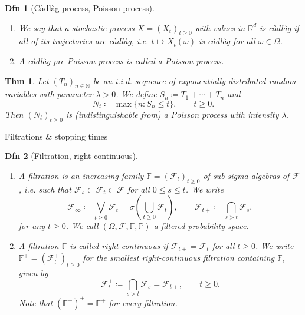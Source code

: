 \documentclass[a4paper]{article}
\theoremstyle{mytheoremstyle}
\newtheorem{definition}{Dfn}
\newtheorem{theorem}{Thm}
\newcommand{\1}{\mathds{1}}
\begin{document}
\begin{multicols*}{3}
\begin{unlabeledbox}
  \begin{definition}[C{\`a}dl{\`a}g process, Poisson process]
    \begin{enumerate}
      \item We say that a stochastic process $X = (X_t)_{t \geqslant 0}$ with values in
      $\mathbb{R}^d$ is {\emph{c{\`a}dl{\`a}g}} if all of its trajectories are
      {\emph{c{\`a}dl{\`a}g}}, i.e. $t \mapsto X_t (\omega)$ is {\emph{c{\`a}dl{\`a}g}}
      for all $\omega \in \Omega$.

      \item A c{\`a}dl{\`a}g pre-Poisson process is called a {\emph{Poisson
        process}}.
    \end{enumerate}
  \end{definition}

  \begin{theorem}
    \label{thm:construction.poisson}Let $(T_n)_{n \in \mathbb{N}}$ be an i.i.d.  sequence
    of exponentially distributed random variables with parameter $\lambda > 0$. We define
    $S_n \coloneq T_1 + \cdots + T_n$ and \[ N_t \coloneq \max \{ n : S_n \leqslant t \},
    \qquad t \geqslant 0. \] Then $(N_t)_{t \geqslant 0}$ is (indistinguishable from) a
    Poisson process with intensity $\lambda$.
  \end{theorem}
\end{unlabeledbox}

\begin{roundbox}{Filtrations \& stopping times}
\begin{definition}[Filtration, right-continuous]
  \begin{enumerate}
    \item
      A {\emph{filtration}} is an increasing family $\mathbb{F}=
      (\mathcal{F}_t)_{t \geqslant 0}$ of sub sigma-algebras of $\mathcal{F}$,
      i.e. such that $\mathcal{F}_s \subset \mathcal{F}_t \subset \mathcal{F}$
      for all $0 \leqslant s \leqslant t$. We write
      \vspace{-1em}
      \[
        \mathcal{F}_{\infty} \coloneq \bigvee_{t \geqslant 0}
        \mathcal{F}_t = \sigma \left( \bigcup_{t \geqslant 0} \mathcal{F}_t \right),
        \qquad \mathcal{F}_{t +} \coloneq \bigcap_{s > t} \mathcal{F}_s,
      \]
      for any $t \geqslant 0$. We call $(\Omega, \mathcal{F}, \mathbb{F},
      \mathbb{P})$ a {\emph{filtered probability space}}.
    
    \item 
      A filtration $\mathbb{F}$ is called {\emph{right-continuous}} if
      $\mathcal{F}_{t +} =\mathcal{F}_t$ for all $t \geqslant 0$. We write
      $\mathbb{F}^+ = (\mathcal{F}^+_t)_{t \geqslant 0}$ for the smallest
      right-continuous filtration containing $\mathbb{F}$, given by
      \vspace{-0.25em}
      \[
        \mathcal{F}^+_t \coloneq \bigcap_{s > t} \mathcal{F}_s =\mathcal{F}_{t
       +}, \qquad t \geqslant 0.
      \]
      \vspace{-0.25em}
    Note that $(\mathbb{F}^+)^+ =\mathbb{F}^+$ for every filtration.
  \end{enumerate}
\end{definition}


\end{roundbox}
\end{multicols*}
\end{document}
